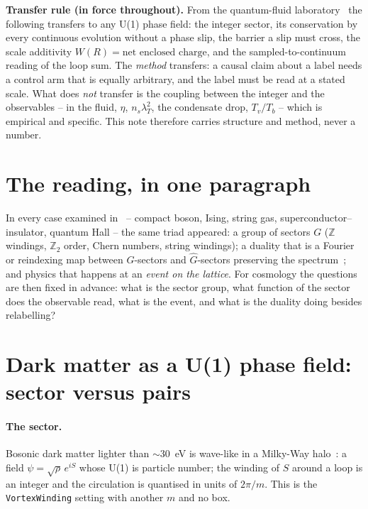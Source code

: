 \documentclass[11pt,a4paper]{article}
\newcommand{\lean}[1]{\texttt{\small #1}}
\begin{document}
\begin{rulebox}
\textbf{Transfer rule (in force throughout).} From the quantum-fluid laboratory~\cite{Callens2026Causal,
Callens2026Astro} the following transfers to any U(1) phase field: the integer sector, its conservation by every
continuous evolution without a phase slip, the barrier a slip must cross, the scale additivity
$W(R)=\text{net enclosed charge}$, and the sampled-to-continuum reading of the loop sum. The \emph{method}
transfers: a causal claim about a label needs a control arm that is equally arbitrary, and the label must be
read at a stated scale. What does \emph{not} transfer is the coupling between the integer and the observables
-- in the fluid, $\eta$, $n_s\lambda_T^2$, the condensate drop, $T_v/T_b$ -- which is empirical and specific. This
note therefore carries structure and method, never a number.
\end{rulebox}

\section{The reading, in one paragraph}

In every case examined in~\cite{Callens2026Duality} -- compact boson, Ising, string gas, superconductor--insulator,
quantum Hall -- the same triad appeared: a group of sectors $G$ ($\mathbb Z$ windings, $\mathbb Z_2$ order,
Chern numbers, string windings); a duality that is a Fourier or reindexing map between $G$-sectors and
$\hat G$-sectors preserving the spectrum~\cite{Savit1980}; and physics that happens at an \emph{event on the
lattice}. For cosmology the questions are then fixed in advance: what is the sector group, what function of the
sector does the observable read, what is the event, and what is the duality doing besides relabelling?

\section{Dark matter as a U(1) phase field: sector versus pairs}

\paragraph{The sector.} Bosonic dark matter lighter than $\sim30$~eV is wave-like in a Milky-Way
halo~\cite{HuBarkanaGruzinov2000,HuiOstrikerTremaineWitten2017}: a field $\psi=\sqrt\rho\,e^{iS}$ whose U(1) is
particle number; the winding of $S$ around a loop is an integer and the circulation is quantised in units of
$2\pi/m$. This is the \lean{VortexWinding} setting with another $m$ and no box.
\end{document}
